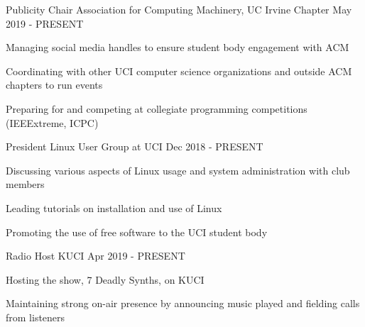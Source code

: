 
\begin{cventries}
	\cventry
	{Publicity Chair}
	{Association for Computing Machinery, UC Irvine Chapter}
	{}
	{May 2019 - PRESENT}
	{\begin{cvitems}
		\item{Managing social media handles to ensure student body engagement with ACM}
		\item{Coordinating with other UCI computer science organizations and outside ACM chapters to run events}
		\item{Preparing for and competing at collegiate programming competitions (IEEExtreme, ICPC)}
	 \end{cvitems}	
	}
	
	\cventry
	{President}
	{Linux User Group at UCI}
	{}
	{Dec 2018 - PRESENT}
	{\begin{cvitems}
		\item{Discussing various aspects of Linux usage and system administration with club members}
		\item{Leading tutorials on installation and use of Linux}
		\item{Promoting the use of free software to the UCI student body}
	 \end{cvitems}
 	}
 
	 \cventry
	 {Radio Host}
	 {KUCI}
	 {}
	 {Apr 2019 - PRESENT}
	 {
	 	\begin{cvitems}
	 		\item {Hosting the show, 7 Deadly Synths, on KUCI}
	 		\item {Maintaining strong on-air presence by announcing music played and fielding calls from listeners}
	 	\end{cvitems}
	 }
	
\end{cventries}
